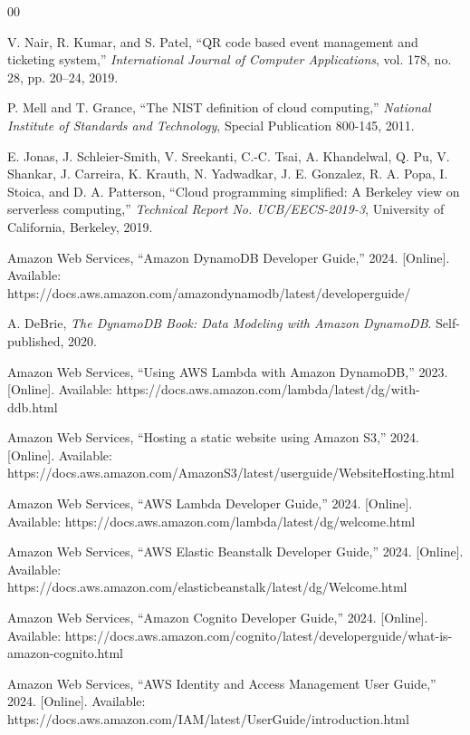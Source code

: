 \documentclass[conference]{IEEEtran}
\begin{document}
\begin{thebibliography}{00}

 V. Nair, R. Kumar, and S. Patel, ``QR code based event management and ticketing system,'' \textit{International Journal of Computer Applications}, vol. 178, no. 28, pp. 20--24, 2019.

 P. Mell and T. Grance, ``The NIST definition of cloud computing,'' \textit{National Institute of Standards and Technology}, Special Publication 800-145, 2011.

 E. Jonas, J. Schleier-Smith, V. Sreekanti, C.-C. Tsai, A. Khandelwal, Q. Pu, V. Shankar, J. Carreira, K. Krauth, N. Yadwadkar, J. E. Gonzalez, R. A. Popa, I. Stoica, and D. A. Patterson, ``Cloud programming simplified: A Berkeley view on serverless computing,'' \textit{Technical Report No. UCB/EECS-2019-3}, University of California, Berkeley, 2019.

 Amazon Web Services, ``Amazon DynamoDB Developer Guide,'' 2024. [Online]. Available: https://docs.aws.amazon.com/amazondynamodb/latest/developerguide/

 A. DeBrie, \textit{The DynamoDB Book: Data Modeling with Amazon DynamoDB}. Self-published, 2020.

 Amazon Web Services, ``Using AWS Lambda with Amazon DynamoDB,'' 2023. [Online]. Available: https://docs.aws.amazon.com/lambda/latest/dg/with-ddb.html

 Amazon Web Services, ``Hosting a static website using Amazon S3,'' 2024. [Online]. Available: https://docs.aws.amazon.com/AmazonS3/latest/userguide/WebsiteHosting.html

 Amazon Web Services, ``AWS Lambda Developer Guide,'' 2024. [Online]. Available: https://docs.aws.amazon.com/lambda/latest/dg/welcome.html

 Amazon Web Services, ``AWS Elastic Beanstalk Developer Guide,'' 2024. [Online]. Available: https://docs.aws.amazon.com/elasticbeanstalk/latest/dg/Welcome.html

 Amazon Web Services, ``Amazon Cognito Developer Guide,'' 2024. [Online]. Available: https://docs.aws.amazon.com/cognito/latest/developerguide/what-is-amazon-cognito.html

 Amazon Web Services, ``AWS Identity and Access Management User Guide,'' 2024. [Online]. Available: https://docs.aws.amazon.com/IAM/latest/UserGuide/introduction.html

\end{thebibliography}
\end{document}
